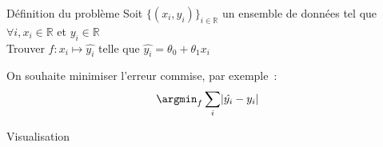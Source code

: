 \begin{frame}{Définition du problème}
  Soit $\{(x_i, y_i)\}_{i \in \mathbb{R}}$ un ensemble de données tel que $\forall i, x_i \in \mathbb{R}$ et $y_i \in \mathbb{R}$ \\

  Trouver $f: x_i \mapsto \hat{y_i}$ telle que $\hat{y_i} = \theta_0 + \theta_1 x_i$

  On souhaite minimiser l'erreur commise, par exemple~:
  \[
    \argmin_f \sum_i \lvert \hat{y_i} - y_i \rvert
  \]
\end{frame}

\begin{frame}{Visualisation}
\end{frame}
